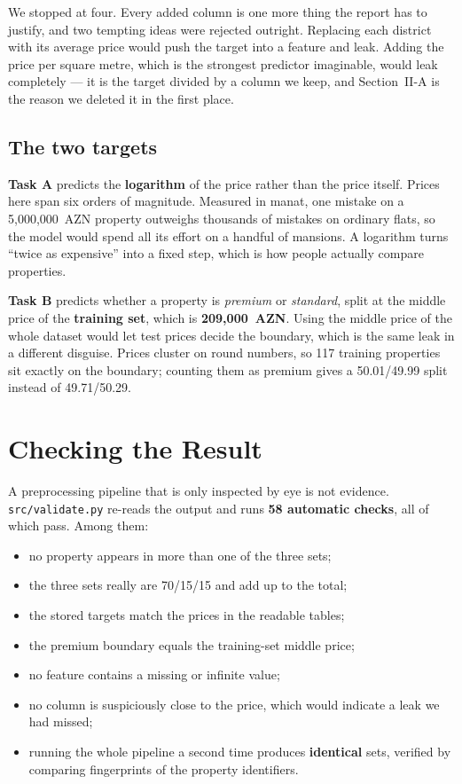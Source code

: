 \documentclass[10pt,twocolumn,a4paper]{article}
\begin{document}
We stopped at four. Every added column is one more thing the report has to
justify, and two tempting ideas were rejected outright. Replacing each
district with its average price would push the target into a feature and
leak. Adding the price per square metre, which is the strongest predictor
imaginable, would leak completely --- it is the target divided by a column
we keep, and Section~II-A is the reason we deleted it in the first place.

\subsection{The two targets}

\textbf{Task A} predicts the \textbf{logarithm} of the price rather than
the price itself. Prices here span six orders of magnitude. Measured in
manat, one mistake on a 5{,}000{,}000~AZN property outweighs thousands of
mistakes on ordinary flats, so the model would spend all its effort on a
handful of mansions. A logarithm turns ``twice as expensive'' into a
fixed step, which is how people actually compare properties.

\textbf{Task B} predicts whether a property is \emph{premium} or
\emph{standard}, split at the middle price of the \textbf{training set},
which is \textbf{209{,}000~AZN}. Using the middle price of the whole
dataset would let test prices decide the boundary, which is the same
leak in a different disguise. Prices cluster on round numbers, so 117
training properties sit exactly on the boundary; counting them as
premium gives a 50.01/49.99 split instead of 49.71/50.29.

\section{Checking the Result}

A preprocessing pipeline that is only inspected by eye is not evidence.
\texttt{src/validate.py} re-reads the output and runs \textbf{58
automatic checks}, all of which pass. Among them:

\begin{itemize}\itemsep2pt
  \item no property appears in more than one of the three sets;
  \item the three sets really are 70/15/15 and add up to the total;
  \item the stored targets match the prices in the readable tables;
  \item the premium boundary equals the training-set middle price;
  \item no feature contains a missing or infinite value;
  \item no column is suspiciously close to the price, which would
        indicate a leak we had missed;
  \item running the whole pipeline a second time produces
        \textbf{identical} sets, verified by comparing fingerprints of
        the property identifiers.
\end{itemize}
\end{document}
